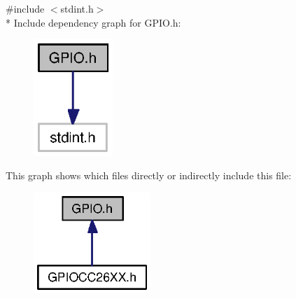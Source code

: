 {\ttfamily \#include $<$stdint.\+h$>$}\\*
Include dependency graph for G\+P\+I\+O.\+h\+:
\nopagebreak
\begin{figure}[H]
\begin{center}
\leavevmode
\includegraphics[width=85pt]{_g_p_i_o_8h__incl}
\end{center}
\end{figure}
This graph shows which files directly or indirectly include this file\+:
\nopagebreak
\begin{figure}[H]
\begin{center}
\leavevmode
\includegraphics[width=125pt]{_g_p_i_o_8h__dep__incl}
\end{center}
\end{figure}
